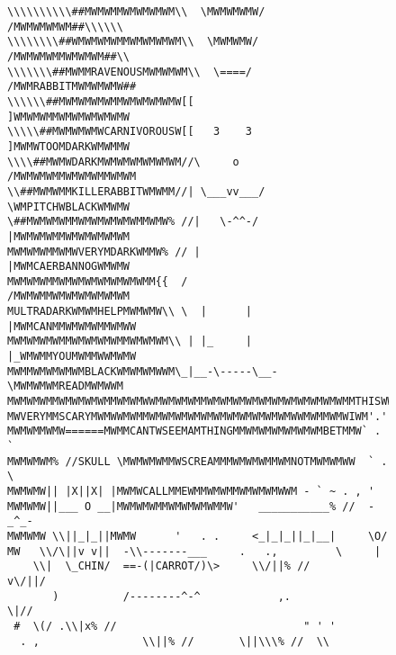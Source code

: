 \documentclass{metanorma}
\begin{document}
\begin{figure}[h]
\begin{verbatim}
\\\\\\\\\\##MWMWMMWMWMWMWM\\  \MWMWMWMW/  /MWMWMWMWM##\\\\\\
\\\\\\\\##WMWMWMWMMWMWMWMWM\\  \MWMWMW/  /MWMWMWMMWMWMWM##\\
\\\\\\\##MWMMRAVENOUSMWMWMWM\\  \====/  /MWMRABBITMWMWMWMW##
\\\\\\##MWMWMWMWMMWMWMWMWMW[[            ]WMWMWMMWMWMWMWMWMW
\\\\\##MWMWMWMWCARNIVOROUSW[[   3    3   ]MWMWTOOMDARKWMWMMW
\\\\##MWMWDARKMWMWMWMWMWMWM//\     o    /MWMWMWMMWMWMWMMWMWM
\\##MWMWMMKILLERABBITWMWMM//| \___vv___/ \WMPITCHWBLACKWMWMW
\##MWMWMWMMWMWMWMWMWMMWMW% //|   \-^^-/   |MWMWMWMMWMWMWMWMWM
MWMWMWMMWMWVERYMDARKWMMW% // |            |MWMCAERBANNOGWMWMW
MWMWMWMMWMWMWMWMWMWMWMM{{  /             /MWMWMMWMWMWMWMWMWM
MULTRADARKWMWMHELPMWMWMW\\ \  |      |  |MWMCANMMWMWMWMMWMWW
MWMWMWMWMMWMWMWMWMMWMWMWM\\ | |_     |  |_WMWMMYOUMWMMWWMWMW
MWMMWMWMWMWMBLACKWMWMWMWWM\_|__-\-----\__-\MWMWMWMREADMWMWWM
MWMWMWMMWMWMWMWMMWMWMWWMWMWMWMMWMWMWMWMWMWMWMWMWMWMWMMTHISWW
MWVERYMMSCARYMWMWWMWMMWMWMWMWMWMWMWMWMWMWMWMWWMWMMWMWIWM'.',
MWMWMMWMW======MWMMCANTWSEEMAMTHINGMMWMWMWMWMWMWMBETMMW` . `
MWMWMWM% //SKULL \MWMWMWMMWSCREAMMMWMWMWMMWMNOTMWMWMWW  ` . \
MWMWMW|| |X||X| |MWMWCALLMMEWMMWMWMMWMWMWMWWM - ` ~ . , '
MWMWMW||___ O __|MWMWMWMMWMWMWMWMMW'   ___________% //  -_^_-
MWMWMW \\||_|_||MWMW      '   . .     <_|_|_||_|__|     \O/
MW   \\/\||v v||  -\\-------___     .   .,         \     |
    \\|  \_CHIN/  ==-(|CARROT/)\>     \\/||% //        v\/||/
       )          /--------^-^            ,.            \|//
 #  \(/ .\\|x% //                             " ' '
  . ,                \\||% //       \||\\\% //  \\
\end{verbatim}

\end{figure}
\end{document}

